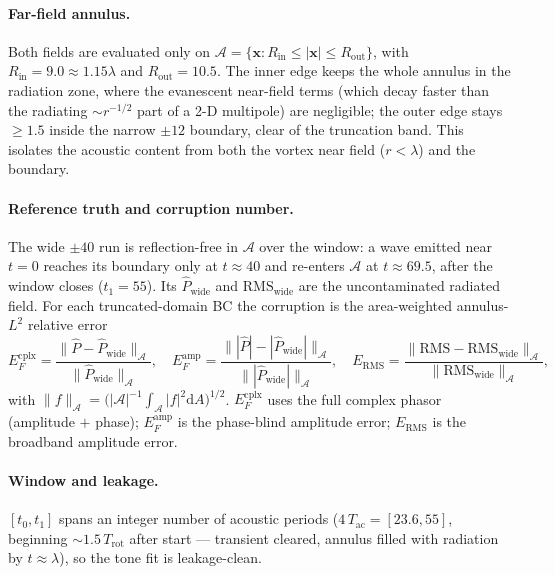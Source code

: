 \documentclass[11pt]{article}
\newcommand{\dd}{\mathrm{d}}
\begin{document}
\paragraph{Far-field annulus.} Both fields are evaluated only on
$\mathcal A=\{\bm x:R_{\text{in}}\le|\bm x|\le R_{\text{out}}\}$, with
$R_{\text{in}}=9.0\approx1.15\lambda$ and $R_{\text{out}}=10.5$. The inner edge keeps
the whole annulus in the radiation zone, where the evanescent near-field terms
(which decay faster than the radiating $\sim r^{-1/2}$ part of a 2-D multipole)
are negligible; the outer edge stays $\ge1.5$ inside the narrow $\pm12$ boundary,
clear of the truncation band. This isolates the acoustic content from both the vortex near field
($r<\lambda$) and the boundary.

\paragraph{Reference truth and corruption number.} The wide $\pm40$ run is
reflection-free in $\mathcal A$ over the window: a wave emitted near $t=0$
reaches its boundary only at $t\approx40$ and re-enters $\mathcal A$ at
$t\approx69.5$, after the window closes ($t_1=55$). Its $\hat P_{\text{wide}}$
and $\mathrm{RMS}_{\text{wide}}$ are the uncontaminated radiated field. For each
truncated-domain BC the corruption is the area-weighted annulus-$L^2$ relative
error
\begin{equation}
E_F^{\text{cplx}}=\frac{\|\hat P-\hat P_{\text{wide}}\|_{\mathcal A}}
{\|\hat P_{\text{wide}}\|_{\mathcal A}},\quad
E_F^{\text{amp}}=\frac{\big\||\hat P|-|\hat P_{\text{wide}}|\big\|_{\mathcal A}}
{\big\||\hat P_{\text{wide}}|\big\|_{\mathcal A}},\quad
E_{\text{RMS}}=\frac{\|\mathrm{RMS}-\mathrm{RMS}_{\text{wide}}\|_{\mathcal A}}
{\|\mathrm{RMS}_{\text{wide}}\|_{\mathcal A}},
\end{equation}
with $\|f\|_{\mathcal A}=\big(|\mathcal A|^{-1}\!\int_{\mathcal A}|f|^2\dd A\big)^{1/2}$.
$E_F^{\text{cplx}}$ uses the full complex phasor (amplitude $+$ phase);
$E_F^{\text{amp}}$ is the phase-blind amplitude error; $E_{\text{RMS}}$ is the
broadband amplitude error.

\paragraph{Window and leakage.} $[t_0,t_1]$ spans an integer number of acoustic
periods ($4\,T_{\text{ac}}=[23.6,55]$, beginning $\sim1.5\,T_{\text{rot}}$ after
start --- transient cleared, annulus filled with radiation by $t\approx\lambda$),
so the tone fit is leakage-clean.
\end{document}
